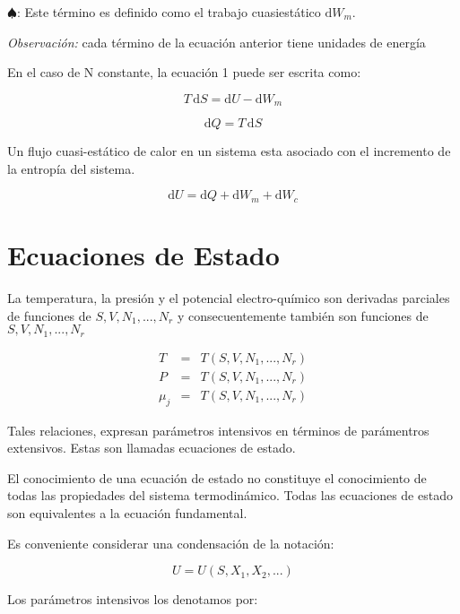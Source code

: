 \documentclass[10pt,twocolumn]{IEEEtran2e}
\newcommand{\ud}{\mathrm{d}}
\begin{document}
$\spadesuit$: Este t\'ermino es definido como el trabajo cuasiest\'atico $\ud W_{m}$.

\textit{Observaci\'on:} cada t\'ermino de la ecuaci\'on anterior tiene unidades de energ\'ia

En el caso de N constante, la ecuaci\'on 1 puede ser escrita como:

\begin{equation}
 T \, \ud S = \ud U -\ud W_{m}
\end{equation}

\begin{equation}
 \ud Q = T \, \ud S
\end{equation}

Un flujo cuasi-est\'atico de calor en un sistema esta asociado con el incremento de la entrop\'ia del sistema.

\begin{equation}
 \ud U = \ud Q + \ud W_{m} + \ud W_{c}
\end{equation}

\section{Ecuaciones de Estado}

La temperatura, la presi\'on y el potencial electro-qu\'imico son derivadas parciales de funciones de $S, V, N_{1},...,N_{r}$ y consecuentemente tambi\'en son funciones de $S,V,N_{1},...,N_{r}$

\begin{eqnarray}
T & = & T(S,V,N_{1},...,N_{r})\\
P & = & T(S,V,N_{1},...,N_{r})\\
\mu_{j} & = & T(S,V,N_{1},...,N_{r})
\end{eqnarray}

Tales relaciones, expresan par\'ametros intensivos en t\'erminos de par\'amentros extensivos.
Estas son llamadas \textsf{ecuaciones de estado}.

El conocimiento de una ecuaci\'on de estado \textsf{no} constituye el conocimiento de todas las propiedades del sistema termodin\'amico.
Todas las ecuaciones de estado son equivalentes a la ecuaci\'on fundamental.

Es conveniente considerar una condensaci\'on de la notaci\'on:

\begin{equation}
 U=U(S,X_{1},X_{2},...)
\end{equation}

Los par\'ametros intensivos los denotamos por:
\end{document}
